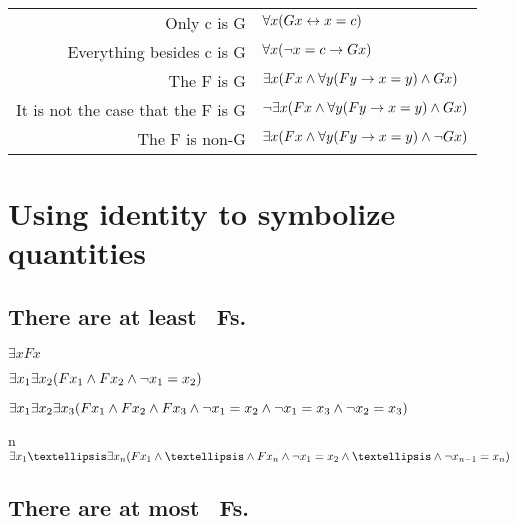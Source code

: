 \hspace{1cm}~\begin{tabular}{rl} \toprule
Only c is G & $\forall x(Gx \leftrightarrow x=c)$\\
Everything besides c is G & $\forall x(\neg x = c \rightarrow Gx)$\\
The F is G & $\exists x(Fx \wedge \forall y(Fy \rightarrow x=y) \wedge Gx)$\\
It is not the case that the F is G & $\neg\exists x(Fx \wedge \forall y(Fy \rightarrow x=y) \wedge Gx)$\\
The F is non-G & $\exists x(Fx \wedge \forall y(Fy \rightarrow x=y) \wedge \neg Gx)$\\\bottomrule
\end{tabular}

\section*{Using identity to symbolize quantities}

\subsection*{There are at least \blank\ Fs.}
\label{summary.atleast}

\begin{ekey}
\item[\text{one}] $\exists xFx$
\item[\text{two}] $\exists x_1\exists x_2(Fx_1 \wedge Fx_2 \wedge \neg x_1  = x_2)$
\item[\text{three}] $\exists x_1\exists x_2\exists x_3(Fx_1 \wedge Fx_2 \wedge Fx_3 \wedge \neg x_1 = x_2 \wedge\neg x_1 = x_3 \wedge \neg x_2 = x_3)$
\item[n] $\exists x_1…\exists x_n(Fx_1 \eand …\eand Fx_n \eand \enot x_1 = x_2 \eand …\eand \enot x_{n-1} = x_n)$ 
\end{ekey}

\subsection*{There are at most \blank\ Fs.}
\label{summary.atmost}

